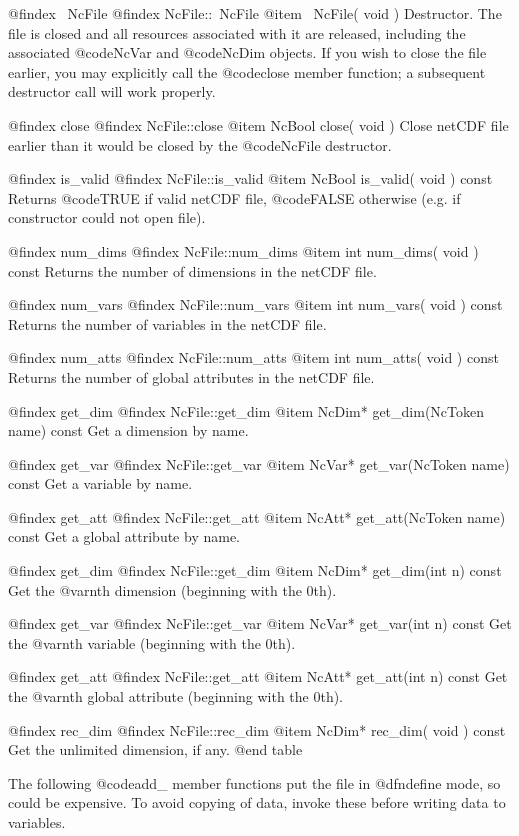 @findex ~NcFile
@findex NcFile::~NcFile
@item ~NcFile( void )
Destructor.  The file is closed and all resources associated with it are
released, including the associated @code{NcVar} and @code{NcDim}
objects.  If you wish to close the file earlier, you may explicitly call
the @code{close} member function; a subsequent destructor call will work
properly.

@findex close
@findex NcFile::close
@item NcBool close( void )
Close netCDF file earlier than it would be closed by the @code{NcFile}
destructor.

@findex is_valid
@findex NcFile::is_valid
@item NcBool is_valid( void ) const
Returns @code{TRUE} if valid netCDF file, @code{FALSE} otherwise (e.g.
if constructor could not open file).

@findex num_dims
@findex NcFile::num_dims
@item int num_dims( void ) const
Returns the number of dimensions in the netCDF file.

@findex num_vars
@findex NcFile::num_vars
@item int num_vars( void ) const
Returns the number of variables in the netCDF file.

@findex num_atts
@findex NcFile::num_atts
@item int num_atts( void ) const
Returns the number of global attributes in the netCDF file.

@findex get_dim
@findex NcFile::get_dim
@item NcDim* get_dim(NcToken name) const
Get a dimension by name.

@findex get_var
@findex NcFile::get_var
@item NcVar* get_var(NcToken name) const
Get a variable by name.

@findex get_att
@findex NcFile::get_att
@item NcAtt* get_att(NcToken name) const
Get a global attribute by name.

@findex get_dim
@findex NcFile::get_dim
@item NcDim* get_dim(int n) const
Get the @var{n}th dimension (beginning with the 0th).

@findex get_var
@findex NcFile::get_var
@item NcVar* get_var(int n) const
Get the @var{n}th variable (beginning with the 0th).

@findex get_att
@findex NcFile::get_att
@item NcAtt* get_att(int n) const
Get the @var{n}th global attribute (beginning with the 0th).

@findex rec_dim
@findex NcFile::rec_dim
@item NcDim* rec_dim( void ) const
Get the unlimited dimension, if any.
@end table

The following @code{add_} member functions put the file in @dfn{define
mode}, so could be expensive.  To avoid copying of data, invoke
these before writing data to variables.

